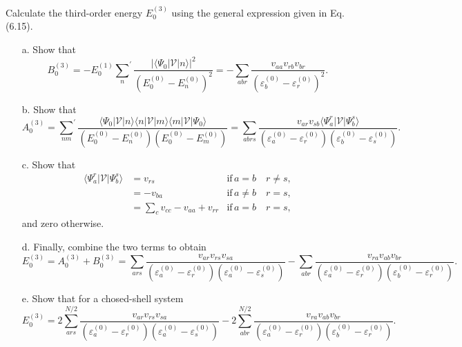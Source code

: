 \documentclass[a4paper]{book}
\newcounter{exercise}[chapter]
\begin{document}
	\begin{exercise}
	Calculate the third-order energy $E^{(3)}_0$ using the general expression given in Eq.(6.15).
	\begin{enumerate}
	
	\item[a.] Show that
	\[
		B^{(3)}_0 = - E^{(1)}_0 { \sum_n }^\prime \frac{|\langle \Psi_0 | \mathscr{V} | n \rangle |^2}{(E^{(0)}_0-E^{(0)}_n)^2} = - \sum_{abr} \frac{v_{aa} v_{rb} v_{br}}{( \varepsilon^{(0)}_b - \varepsilon^{(0)}_r)^2}.
	\]
		
	\item[b.] Show that
	\[
		A^{(3)}_0 = { \sum_{nm} }^\prime \frac{\langle \Psi_0 | \mathscr{V} | n \rangle \langle n | \mathscr{V} | m \rangle \langle m | \mathscr{V} | \Psi_0 \rangle}{(E^{(0)}_0-E^{(0)}_n)(E^{(0)}_0-E^{(0)}_m)} = \sum_{abrs} \frac{v_{ar} v_{sb} \langle \Psi^r_a | \mathscr{V} | \Psi^s_b \rangle}{( \varepsilon^{(0)}_a - \varepsilon^{(0)}_r)( \varepsilon^{(0)}_b - \varepsilon^{(0)}_s)}.
	\]
	
	\item[c.] Show that
	\begin{align*}
		\langle \Psi^r_a | \mathscr{V} | \Psi^s_b \rangle &= v_{rs} & \text{if} \, a = b  \quad r \neq s, \\
		&= - v_{ba} & \text{if} \, a \neq b \quad r = s, \\
		&= \sum_{c} v_{cc} - v_{aa} + v_{rr} & \text{if} \, a = b \quad r = s ,
	\end{align*}
	and zero otherwise.
		
	\item[d.] Finally, combine the two terms to obtain
	\[
		E^{(3)}_0 = A^{(3)}_0 + B^{(3)}_0 = \sum_{ars} \frac{v_{ar} v_{rs} v_{sa}}{( \varepsilon^{(0)}_a - \varepsilon^{(0)}_r)( \varepsilon^{(0)}_a - \varepsilon^{(0)}_s)} - \sum_{abr} \frac{v_{ra} v_{ab} v_{br}}{( \varepsilon^{(0)}_a - \varepsilon^{(0)}_r) ( \varepsilon^{(0)}_b - \varepsilon^{(0)}_r)}.
	\]
	
	\item[e.] Show that for a chosed-shell system
	\[
		E^{(3)}_0 = 2\sum_{ars}^{N/2} \frac{v_{ar} v_{rs} v_{sa}}{( \varepsilon^{(0)}_a - \varepsilon^{(0)}_r)( \varepsilon^{(0)}_a - \varepsilon^{(0)}_s)} - 2\sum_{abr}^{N/2} \frac{v_{ra} v_{ab} v_{br}}{( \varepsilon^{(0)}_a - \varepsilon^{(0)}_r) ( \varepsilon^{(0)}_b - \varepsilon^{(0)}_r)}.
	\]
	
	\end{enumerate}
	\end{exercise}
	
\end{document}
